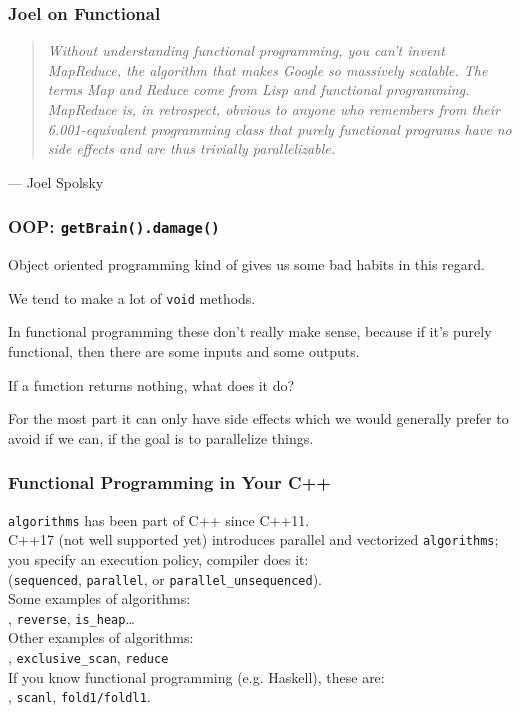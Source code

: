 \begin{frame}
\frametitle{Joel on Functional}

\begin{quote}
\textit{Without understanding functional programming, you can't invent MapReduce, the algorithm that makes Google so massively scalable. The terms Map and Reduce come from Lisp and functional programming. MapReduce is, in retrospect, obvious to anyone who remembers from their 6.001-equivalent programming class that purely functional programs have no side effects and are thus trivially parallelizable.}
\end{quote}
\hfill --- Joel Spolsky


\end{frame}

\begin{frame}
\frametitle{OOP: \texttt{getBrain().damage()}}

Object oriented programming kind of gives us some bad habits in this regard. 

We tend to make a lot of \texttt{void} methods. 

In functional programming these don't really make sense, because if it's purely functional, then there are some inputs and some outputs. 

If a function returns nothing, what does it do? 

For the most part it can only have side effects which we would generally prefer to avoid if we can, if the goal is to parallelize things. 

\end{frame}

\begin{frame}
\frametitle{Functional Programming in Your C++}

{\tt algorithms} has been part of C++ since C++11.\\

C++17 (not well supported yet) introduces parallel and vectorized {\tt algorithms};\\
\qquad you specify an execution policy, compiler does it:\\
\qquad ({\tt sequenced}, {\tt parallel},
or {\tt parallel\_unsequenced}).\\[1em]

Some examples of algorithms:\\
, {\tt reverse}, {\tt is\_heap}\ldots\\[1em]

Other examples of algorithms:\\
, {\tt exclusive\_scan}, {\tt reduce}\\[1em]
If you know functional programming (e.g. Haskell), these are:\\
, {\tt scanl}, {\tt fold1/foldl1}.

\end{frame}




